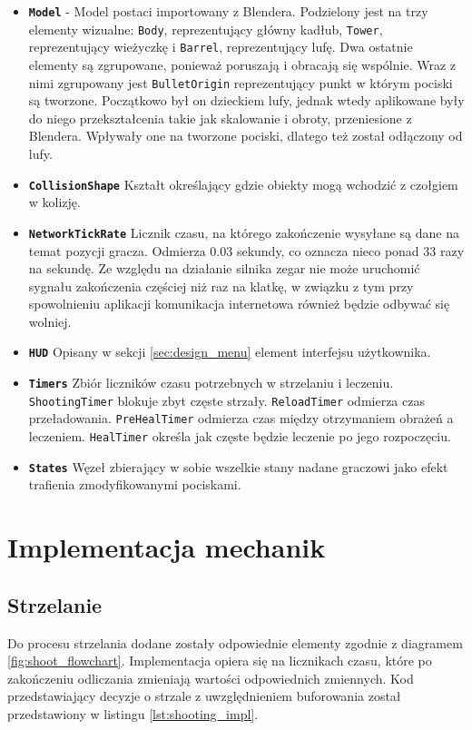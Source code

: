 \begin{itemize}
    \item \textbf{\texttt{Model}} - Model postaci importowany z Blendera. Podzielony jest na trzy elementy wizualne: \texttt{Body}, reprezentujący główny kadłub, \texttt{Tower}, reprezentujący wieżyczkę i \texttt{Barrel}, reprezentujący lufę. Dwa ostatnie elementy są zgrupowane, ponieważ poruszają i obracają się wspólnie. Wraz z nimi zgrupowany jest \texttt{BulletOrigin} reprezentujący punkt w którym pociski są tworzone. Początkowo był on dzieckiem lufy, jednak wtedy aplikowane były do niego przekształcenia takie jak skalowanie i obroty, przeniesione z Blendera. Wpływały one na tworzone pociski, dlatego też został odłączony od lufy.  
    \item \textbf{\texttt{CollisionShape}} Kształt określający gdzie obiekty mogą wchodzić z czołgiem w kolizję. 
    \item \textbf{\texttt{NetworkTickRate}} Licznik czasu, na którego zakończenie wysyłane są dane na temat pozycji gracza. Odmierza 0.03 sekundy, co oznacza nieco ponad 33 razy na sekundę. Ze względu na działanie silnika zegar nie może uruchomić sygnału zakończenia częściej niż raz na klatkę, w związku z tym przy spowolnieniu aplikacji komunikacja internetowa również będzie odbywać się wolniej.
    \item \textbf{\texttt{HUD}} Opisany w sekcji \ref{sec:design_menu} element interfejsu użytkownika.
    \item \textbf{\texttt{Timers}} Zbiór liczników czasu potrzebnych w strzelaniu i leczeniu. \texttt{ShootingTimer} blokuje zbyt częste strzały. \texttt{ReloadTimer} odmierza czas przeładowania. \texttt{PreHealTimer} odmierza czas między otrzymaniem obrażeń a leczeniem. \texttt{HealTimer} określa jak częste będzie leczenie po jego rozpoczęciu. 
    \item \textbf{\texttt{States}} Węzeł zbierający w sobie wszelkie stany nadane graczowi jako efekt trafienia zmodyfikowanymi pociskami.
\end{itemize} 

\section{Implementacja mechanik}
\subsection{Strzelanie}
Do procesu strzelania dodane zostały odpowiednie elementy zgodnie z diagramem \ref{fig:shoot_flowchart}. Implementacja opiera się na licznikach czasu, które po zakończeniu odliczania zmieniają wartości odpowiednich zmiennych. Kod przedstawiający decyzje o strzale z uwzględnieniem buforowania został przedstawiony w listingu \ref{lst:shooting_impl}.

